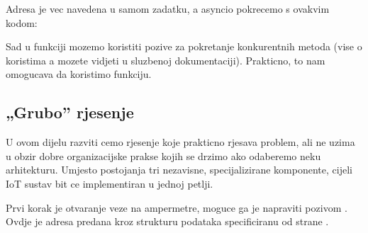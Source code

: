 \documentclass[letterpaper,10pt,croatian]{sphinxmanual}
\begin{document}
\sphinxAtStartPar
Adresa je vec navedena u samom zadatku, a asyncio pokrecemo s ovakvim kodom:

\begin{sphinxVerbatim}[commandchars=\\\{\}]
 
 


  


 


   
\end{sphinxVerbatim}

\sphinxAtStartPar
Sad u  funkciji mozemo koristiti  pozive za pokretanje
konkurentnih metoda (vise o koristima \sphinxhyphen{}a mozete vidjeti u sluzbenoj
dokumentaciji). Prakticno, to nam omogucava da koristimo 
funkciju.


\subsection{„Grubo” rjesenje}
\label{\detokenize{01-architecture/index:grubo-rjesenje}}
\sphinxAtStartPar
U ovom dijelu razviti cemo rjesenje koje prakticno rjesava problem, ali ne
uzima u obzir dobre organizacijske prakse kojih se drzimo ako odaberemo neku
arhitekturu. Umjesto postojanja tri nezavisne, specijalizirane komponente,
cijeli IoT sustav bit ce implementiran u jednoj  petlji.

\sphinxAtStartPar
Prvi korak je otvaranje veze na ampermetre, moguce ga je napraviti pozivom
. Ovdje je adresa
predana kroz strukturu podataka specificiranu od strane .
\end{document}
